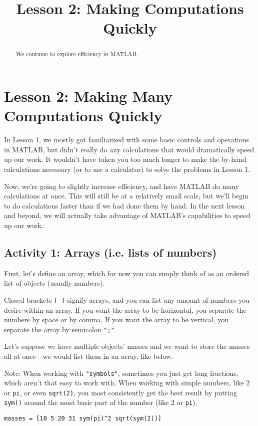 \documentclass{ximera}
\title{Lesson 2: Making Computations Quickly}
\begin{document}
\begin{abstract}
We continue to explore efficiency in MATLAB.
\end{abstract}

\section*{Lesson 2: Making Many Computations Quickly}

In Lesson 1, we mostly got familiarized with some basic controls and operations in MATLAB, but didn't really do any calculations that would dramatically speed up our work. It wouldn't have taken you too much longer to make the by-hand calculations necessary (or to use a calculator) to solve the problems in Lesson 1.

Now, we're going to slightly increase efficiency, and have MATLAB do many calculations at once. This will still be at a relatively small scale, but we'll begin to do calculations faster than if we had done them by hand. In the next lesson and beyond, we will actually take advantage of MATLAB's capabilities to speed up our work.

\subsection*{Activity 1: Arrays (i.e. lists of numbers)}

First, let's define an array, which for now you can simply think of as an ordered list of objects (usually numbers).

Closed brackets \texttt{[ ]} signify arrays, and you can list any amount of numbers you desire within an array. If you want the array to be horizontal, you separate the numbers by space or by comma. If you want the array to be vertical, you separate the array by semicolon \texttt{";"}.

Let's suppose we have multiple objects' masses and we want to store the masses all at once—we would list them in an array, like below.

\begin{remark}
Note: When working with \texttt{"symbols"}, sometimes you just get long fractions, which aren't that easy to work with. When working with simple numbers, like 2 or \texttt{pi}, or even \texttt{sqrt(2)}, you most consistently get the best result by putting \texttt{sym()} around the most basic part of the number (like 2 or \texttt{pi}).
\end{remark}

\begin{verbatim}
masses = [10 5 20 31 sym(pi)^2 sqrt(sym(2))]
\end{verbatim}
\end{document}
